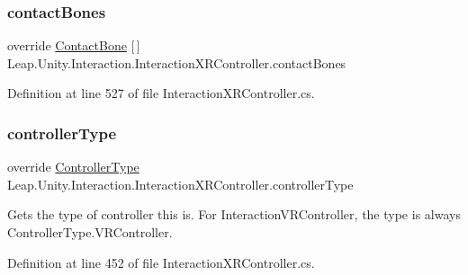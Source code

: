 \subsubsection{\texorpdfstring{contactBones}{contactBones}}
{\footnotesize\ttfamily override \mbox{\hyperlink{class_leap_1_1_unity_1_1_interaction_1_1_contact_bone}{Contact\+Bone}} \mbox{[}$\,$\mbox{]} Leap.\+Unity.\+Interaction.\+Interaction\+X\+R\+Controller.\+contact\+Bones\hspace{0.3cm}{\ttfamily [get]}}



Definition at line 527 of file Interaction\+X\+R\+Controller.\+cs.

\mbox{\label{class_leap_1_1_unity_1_1_interaction_1_1_interaction_x_r_controller_aae01e4ff3ef50d766b1a25d02b0e3e26}} 
\subsubsection{\texorpdfstring{controllerType}{controllerType}}
{\footnotesize\ttfamily override \mbox{\hyperlink{namespace_leap_1_1_unity_1_1_interaction_a9752eb3e2905e8ebd134fff20c155e6b}{Controller\+Type}} Leap.\+Unity.\+Interaction.\+Interaction\+X\+R\+Controller.\+controller\+Type\hspace{0.3cm}{\ttfamily [get]}}



Gets the type of controller this is. For Interaction\+V\+R\+Controller, the type is always Controller\+Type.\+V\+R\+Controller. 



Definition at line 452 of file Interaction\+X\+R\+Controller.\+cs.

\mbox{\label{class_leap_1_1_unity_1_1_interaction_1_1_interaction_x_r_controller_ac3f3ac7b791e70390c8ba9a547162525}} 
